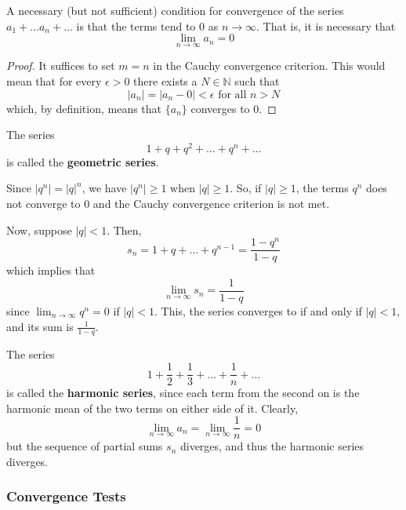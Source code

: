 \documentclass{article}
\begin{document}
      \begin{definition}

      \end{definition}

      \begin{corollary}
      A necessary (but not sufficient) condition for convergence of the series $a_1 + \ldots a_n + \ldots$ is that the terms tend to $0$ as $n \rightarrow \infty$. That is, it is necessary that
      \[\lim_{n\rightarrow \infty} a_n = 0\]
      \end{corollary}
      \begin{proof}
      It suffices to set $m = n$ in the Cauchy convergence criterion. This would mean that for every $\epsilon > 0$ there exists a $N \in \mathbb{N}$ such that 
      \[|a_n| = |a_n - 0| < \epsilon \text{ for all } n > N\]
      which, by definition, means that $\{a_n\}$ converges to $0$. 
      \end{proof}

      \begin{example}
        The series 
        \[1 + q + q^2 + \ldots + q^n + \ldots\]
        is called the \textbf{geometric series}. 

        Since $|q^n| = |q|^n$, we have $|q^n| \geq 1$ when $|q| \geq 1$. So, if $|q| \geq 1$, the terms $q^n$ does not converge to $0$ and the Cauchy convergence criterion is not met. 

        Now, suppose $|q|<1$. Then, 
        \[s_n = 1 + q + \ldots + q^{n-1} = \frac{1 - q^n}{1-q}\]
        which implies that
        \[\lim_{n\rightarrow \infty} s_n = \frac{1}{1-q}\]
        since $\lim_{n\rightarrow \infty} q^n = 0$ if $|q|<1$. This, the series converges to if and only if $|q|<1$, and its sum is $\frac{1}{1-q}$. 
      \end{example}

      \begin{example}
        The series 
        \[1 + \frac{1}{2} + \frac{1}{3} + \ldots + \frac{1}{n} + \ldots\]
        is called the \textbf{harmonic series}, since each term from the second on is the harmonic mean of the two terms on either side of it. Clearly, 
        \[\lim_{n \rightarrow \infty} a_n = \lim_{n \rightarrow \infty} \frac{1}{n} = 0\]
        but the sequence of partial sums $s_n$ diverges, and thus the harmonic series diverges. 
      \end{example}

    \subsubsection{Convergence Tests}
\end{document}
